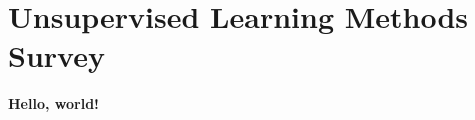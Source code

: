 \documentclass[../main.tex]{subfiles}
\begin{document}
    
\chapter{Unsupervised Learning Methods Survey}
    
\textbf{Hello, world!}
\end{document}
